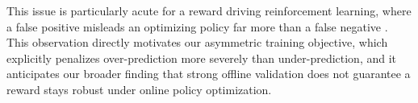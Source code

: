 This issue is particularly acute for a reward driving reinforcement learning, where a false positive misleads an optimizing policy far more than a false negative \citep{gumbsch_demonstrations_2026}. This observation directly motivates our asymmetric training objective, which explicitly penalizes over-prediction more severely than under-prediction, and it anticipates our broader finding that strong offline validation does not guarantee a reward stays robust under online policy optimization.